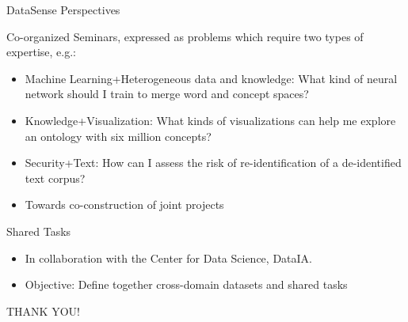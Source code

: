 \begin{frame}{DataSense Perspectives}

Co-organized Seminars,
expressed as problems which require two types of expertise, e.g.:

\begin{itemize}
\item Machine Learning+Heterogeneous data and knowledge:
  What kind of neural network should I train to merge word and concept spaces?
\item Knowledge+Visualization: What kinds of visualizations can help me explore an ontology with six million concepts?
\item Security+Text: How can I assess the risk of re-identification of a de-identified text corpus?

\item  Towards co-construction of joint projects
\end{itemize}

Shared Tasks

\begin{itemize}
\item In collaboration with the Center for Data Science, DataIA.
\item Objective: Define together cross-domain datasets and shared tasks
\end{itemize}
\end{frame}

\begin{frame}[plain]{}

  \vfill
  \begin{center}
    \huge THANK YOU!
  \end{center}
  \vfill

\end{frame}

